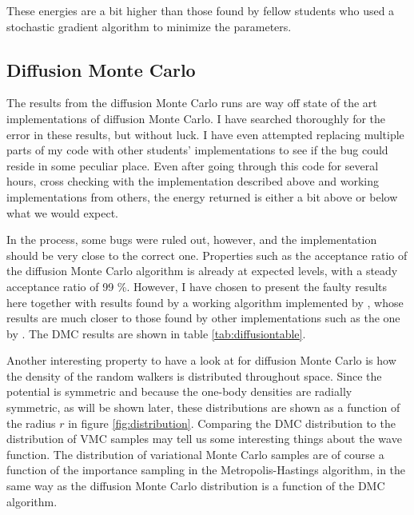\documentclass[aps,prb,twocolumn,floatfix]{revtex4}
\begin{document}
These energies are a bit higher than those found by fellow students who used a stochastic gradient algorithm to minimize the parameters.\cite{sigve,karl}

\subsection{Diffusion Monte Carlo}

The results from the diffusion Monte Carlo runs are way off state of the art implementations of diffusion Monte Carlo. I have searched thoroughly for the error in these results, but without luck. I have even attempted replacing multiple parts of my code with other students' implementations to see if the bug could reside in some peculiar place. Even after going through this code for several hours, cross checking with the implementation described above and working implementations from others, the energy returned is either a bit above or below what we would expect.

In the process, some bugs were ruled out, however, and the implementation should be very close to the correct one. Properties such as the acceptance ratio of the diffusion Monte Carlo algorithm is already at expected levels, with a steady acceptance ratio of 99 \%. However, I have chosen to present the faulty results here together with results found by a working algorithm implemented by \textcite{sigve}, whose results are much closer to those found by other implementations such as the one by \cite{PhysRevB.84.115302}. The DMC results are shown in table \ref{tab:diffusiontable}.

Another interesting property to have a look at for diffusion Monte Carlo is how the density of the random walkers is distributed throughout space. Since the potential is symmetric and because the one-body densities are radially symmetric, as will be shown later, these distributions are shown as a function of the radius $r$ in figure \ref{fig:distribution}. Comparing the DMC distribution to the distribution of VMC samples may tell us some interesting things about the wave function. The distribution of variational Monte Carlo samples are of course a function of the importance sampling in the Metropolis-Hastings algorithm, in the same way as the diffusion Monte Carlo distribution is a function of the DMC algorithm.
\end{document}
